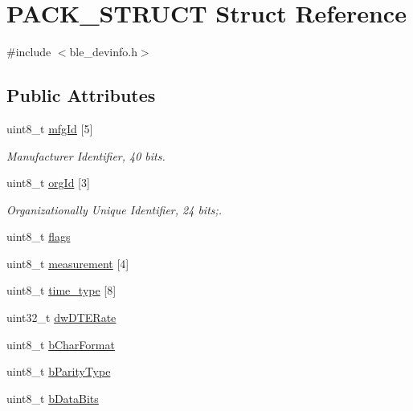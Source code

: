 \hypertarget{struct_p_a_c_k___s_t_r_u_c_t}{\section{P\-A\-C\-K\-\_\-\-S\-T\-R\-U\-C\-T Struct Reference}
\label{struct_p_a_c_k___s_t_r_u_c_t}
}


{\ttfamily \#include $<$ble\-\_\-devinfo.\-h$>$}

\subsection*{Public Attributes}
\begin{DoxyCompactItemize}
\item 
uint8\-\_\-t \hyperlink{struct_p_a_c_k___s_t_r_u_c_t_a65dbb98bcbfa5302e6fe41da293932b3}{mfg\-Id} \mbox{[}5\mbox{]}
\begin{DoxyCompactList}\small\item\em Manufacturer Identifier, 40 bits. \end{DoxyCompactList}\item 
uint8\-\_\-t \hyperlink{struct_p_a_c_k___s_t_r_u_c_t_a45141a2a8fb3becdabd8fe0b83aef1b6}{org\-Id} \mbox{[}3\mbox{]}
\begin{DoxyCompactList}\small\item\em Organizationally Unique Identifier, 24 bits;. \end{DoxyCompactList}\item 
uint8\-\_\-t \hyperlink{struct_p_a_c_k___s_t_r_u_c_t_ae64461a480acaaf582b3af93946387b6}{flags}
\item 
uint8\-\_\-t \hyperlink{struct_p_a_c_k___s_t_r_u_c_t_a04dfae8d6de04756a7cdedc494a926f1}{measurement} \mbox{[}4\mbox{]}
\item 
uint8\-\_\-t \hyperlink{struct_p_a_c_k___s_t_r_u_c_t_a671fc205705b6a76b9a4edeb56f990e6}{time\-\_\-type} \mbox{[}8\mbox{]}
\item 
uint32\-\_\-t \hyperlink{struct_p_a_c_k___s_t_r_u_c_t_af565415de305bf011dc318681d3d3b1c}{dw\-D\-T\-E\-Rate}
\item 
uint8\-\_\-t \hyperlink{struct_p_a_c_k___s_t_r_u_c_t_af0dec498fcd576e9db6b4447f5715c0a}{b\-Char\-Format}
\item 
uint8\-\_\-t \hyperlink{struct_p_a_c_k___s_t_r_u_c_t_aa92cdd7b41d7748edc3695fd95fea81c}{b\-Parity\-Type}
\item 
uint8\-\_\-t \hyperlink{struct_p_a_c_k___s_t_r_u_c_t_a177009e8452a6c785662e422cc457824}{b\-Data\-Bits}
\end{DoxyCompactItemize}


